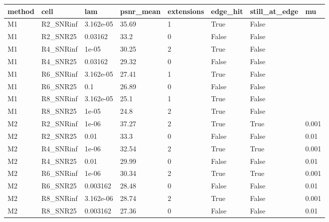 \begin{tabular}{llllllll}
\hline
method & cell & lam & psnr\_mean & extensions & edge\_hit & still\_at\_edge & mu \\
\hline
M1 & R2\_SNRinf & 3.162e-05 & 35.69 & 1 & True & False &  \\
M1 & R2\_SNR25 & 0.03162 & 33.2 & 0 & False & False &  \\
M1 & R4\_SNRinf & 1e-05 & 30.25 & 2 & True & False &  \\
M1 & R4\_SNR25 & 0.03162 & 29.32 & 0 & False & False &  \\
M1 & R6\_SNRinf & 3.162e-05 & 27.41 & 1 & True & False &  \\
M1 & R6\_SNR25 & 0.1 & 26.89 & 0 & False & False &  \\
M1 & R8\_SNRinf & 3.162e-05 & 25.1 & 1 & True & False &  \\
M1 & R8\_SNR25 & 1e-05 & 24.8 & 2 & True & False &  \\
M2 & R2\_SNRinf & 1e-06 & 37.27 & 2 & True & True & 0.001 \\
M2 & R2\_SNR25 & 0.01 & 33.3 & 0 & False & False & 0.01 \\
M2 & R4\_SNRinf & 1e-06 & 32.54 & 2 & True & True & 0.001 \\
M2 & R4\_SNR25 & 0.01 & 29.99 & 0 & False & False & 0.01 \\
M2 & R6\_SNRinf & 1e-06 & 30.34 & 2 & True & True & 0.001 \\
M2 & R6\_SNR25 & 0.003162 & 28.48 & 0 & False & False & 0.01 \\
M2 & R8\_SNRinf & 3.162e-06 & 28.74 & 2 & True & False & 0.001 \\
M2 & R8\_SNR25 & 0.003162 & 27.36 & 0 & False & False & 0.01 \\
\hline
\end{tabular}
